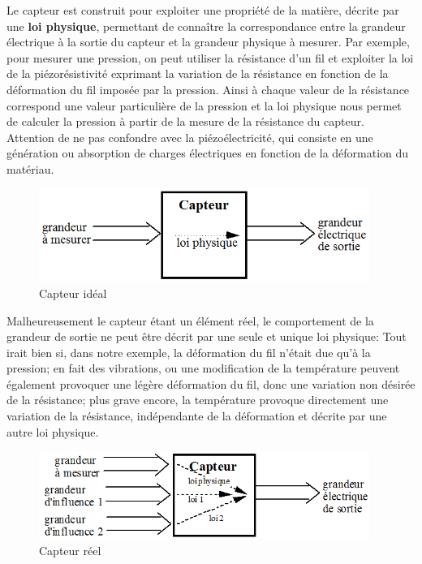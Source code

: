 Le capteur est construit pour exploiter une propriété de la matière, décrite par une \textbf{loi physique}, permettant de connaître la correspondance entre la grandeur électrique à la sortie du capteur et la grandeur physique à mesurer. Par exemple, pour mesurer une pression, on peut utiliser la résistance d'un fil et exploiter la loi de la piézorésistivité exprimant la variation de la résistance en fonction de la déformation du fil imposée par la pression. Ainsi à chaque valeur de la résistance correspond une valeur particulière de la pression et la loi physique nous permet de calculer la pression à partir de la mesure de la résistance du capteur. Attention de ne pas confondre avec la piézoélectricité, qui consiste en une génération ou absorption de charges électriques en fonction de la déformation du matériau.
\begin{figure}
   \centering
   \includegraphics[width=0.96\textwidth]{assets/figures/1_2_Loi_Physique.png}
   \caption{Capteur idéal}
   \label{fig:Loi_Physique}
\end{figure}

Malheureusement le capteur étant un élément réel, le comportement de la grandeur de sortie ne peut être décrit par une seule et unique loi physique: Tout irait bien si, dans notre exemple, la déformation du fil n'était due qu'à la pression; en fait des vibrations, ou une modification de la température peuvent également provoquer une légère déformation du fil, donc une variation non désirée de la résistance; plus grave encore, la température provoque directement une variation de la résistance, indépendante de la déformation et décrite par une autre loi physique.
\begin{figure}
   \centering
   \includegraphics[width=0.96\textwidth]{assets/figures/1_3_Grandeur_Influence.png}
   \caption{Capteur réel}
   \label{fig:Grandeur_Influence}
\end{figure}

